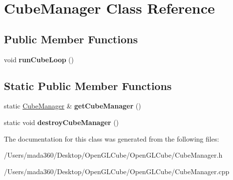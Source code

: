 \hypertarget{class_cube_manager}{}\section{Cube\+Manager Class Reference}
\label{class_cube_manager}
\subsection*{Public Member Functions}
\begin{DoxyCompactItemize}
\item 
\hypertarget{class_cube_manager_ae9f52ee1f0f70b4ff7390b2a0e2eb073}{}void {\bfseries run\+Cube\+Loop} ()\label{class_cube_manager_ae9f52ee1f0f70b4ff7390b2a0e2eb073}

\end{DoxyCompactItemize}
\subsection*{Static Public Member Functions}
\begin{DoxyCompactItemize}
\item 
\hypertarget{class_cube_manager_a98f246d8159125c6c45c8955a3d61083}{}static \hyperlink{class_cube_manager}{Cube\+Manager} \& {\bfseries get\+Cube\+Manager} ()\label{class_cube_manager_a98f246d8159125c6c45c8955a3d61083}

\item 
\hypertarget{class_cube_manager_a1e662a77ada31789b466e1ae62c9fb3b}{}static void {\bfseries destroy\+Cube\+Manager} ()\label{class_cube_manager_a1e662a77ada31789b466e1ae62c9fb3b}

\end{DoxyCompactItemize}


The documentation for this class was generated from the following files\+:\begin{DoxyCompactItemize}
\item 
/\+Users/mada360/\+Desktop/\+Open\+G\+L\+Cube/\+Open\+G\+L\+Cube/Cube\+Manager.\+h\item 
/\+Users/mada360/\+Desktop/\+Open\+G\+L\+Cube/\+Open\+G\+L\+Cube/Cube\+Manager.\+cpp\end{DoxyCompactItemize}
